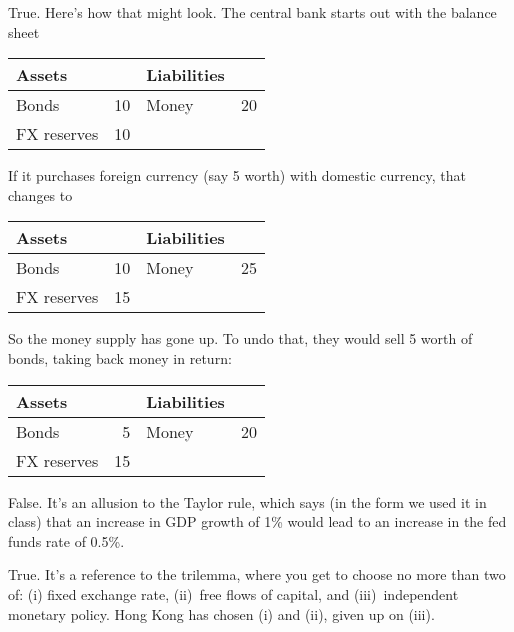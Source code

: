 \documentclass[letterpaper,12pt]{exam}
\begin{document}
\begin{questions}
\begin{solution}
\begin{parts}
\item True.  Here's how that might look.
The central bank starts out with the balance sheet

\begin{center}
\begin{tabular}{lr|lr}
Assets  &&  Liabilities \\
\midrule
Bonds &  10    & Money & 20 \\
FX reserves & 10
\end{tabular}
\end{center}

If it purchases foreign currency (say 5 worth) with domestic currency,
that changes to

\begin{center}
\begin{tabular}{lr|lr}
Assets  &&  Liabilities \\
\midrule
Bonds &  10    & Money & 25 \\
FX reserves & 15
\end{tabular}
\end{center}

So the money supply has gone up.
To undo that, they would sell 5 worth of bonds, taking back money in return:

\begin{center}
\begin{tabular}{lr|lr}
Assets  &&  Liabilities \\
\midrule
Bonds &  5    & Money & 20 \\
FX reserves & 15
\end{tabular}
\end{center}

\item False.
It's an allusion to the Taylor rule,
which says (in the form we used it in class) that an increase in GDP growth
of 1\% would lead to an increase in the fed funds rate of 0.5\%.

\item True.
It's a reference to the trilemma, where you get to choose no more than two of:
(i) fixed exchange rate, (ii)~free flows of capital, and (iii)~independent monetary policy. Hong Kong has chosen (i) and (ii), given up on (iii).

\end{parts}
\end{solution}

\end{questions}


\end{document}
